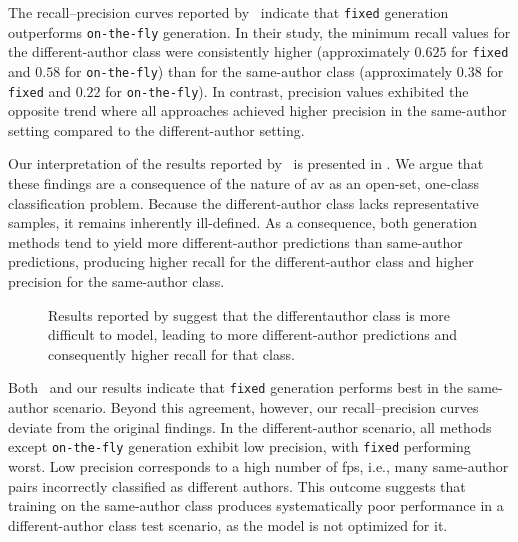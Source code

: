 The recall–precision curves reported by \citet{koppel_determining_2014}\ indicate that \texttt{fixed} \imp{} generation outperforms \texttt{on-the-fly} \imp{} generation.
In their study, the minimum recall values for the different-author class were consistently higher (approximately $0.625$ for \texttt{fixed} and $0.58$ for \texttt{on-the-fly}) than for the same-author class (approximately $0.38$ for \texttt{fixed} and $0.22$ for \texttt{on-the-fly}).
In contrast, precision values exhibited the opposite trend where all approaches achieved higher precision in the same-author setting compared to the different-author setting.

Our interpretation of the results reported by \citet{koppel_determining_2014}\ is presented in .
We argue that these findings are a consequence of the nature of \ac{av} as an open-set, one-class classification problem.
Because the different-author class lacks representative samples, it remains inherently ill-defined.
As a consequence, both \imp{} generation methods tend to yield more different-author predictions than same-author predictions, producing higher recall for the different-author class and higher precision for the same-author class.

\begin{figure}[htbp]
    \centering
    
    \caption[Aggregating original \impAppr{} experiment results.]{Results reported by \citet{koppel_determining_2014} suggest that the different\-author class is more difficult to model, leading to more different-author predictions and consequently higher recall for that class.}
    \label{fig:findings_original_work}
\end{figure}

Both \citet{koppel_determining_2014}\ and our results indicate that \texttt{fixed} \imp{} generation performs best in the same-author scenario.
Beyond this agreement, however, our recall–precision curves deviate from the original findings.
In the different-author scenario, all methods except \texttt{on-the-fly} generation exhibit low precision, with \texttt{fixed} \imps{} performing worst.
Low precision corresponds to a high number of \acp{fp}, i.e., many same-author pairs incorrectly classified as different authors.
This outcome suggests that training on the same-author class produces systematically poor performance in a different-author class test scenario, as the model is not optimized for it.

